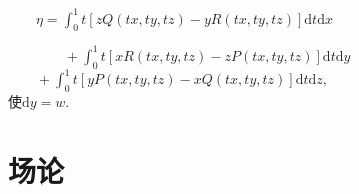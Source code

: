 \begin{enumerate}
\begin{enumerate}
				$\qquad \eta = \displaystyle{\int_{0}^{1}t[zQ(tx,ty,tz)-yR(tx,ty,tz)]\mathrm{d}t\mathrm{d}x}$\\ \qquad 
				
				$\qquad\qquad+\displaystyle{\int_{0}^{1}t[xR(tx,ty,tz)-zP(tx,ty,tz)]\mathrm{d}t\mathrm{d}y}$\\ \qquad
				$
				\qquad +\displaystyle{\int_{0}^{1}t[yP(tx,ty,tz)-xQ(tx,ty,tz)]\mathrm{d}t\mathrm{d}z},$\\
				
			使$\mathrm{d}y=w$.
	\end{enumerate}

\end{enumerate}

\section{场论}